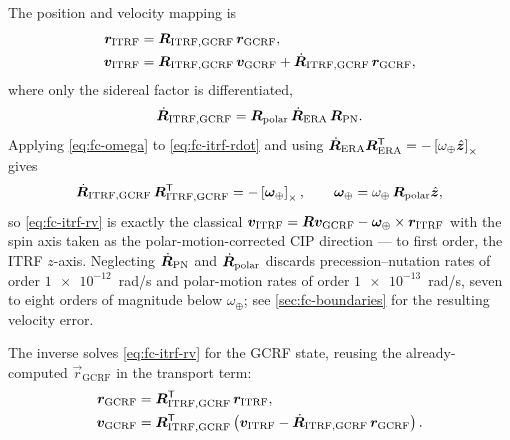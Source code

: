 The position and velocity mapping is
%
\begin{align}
  \label{eq:fc-itrf-rv}
  \bm{r}_{\mathrm{ITRF}} &= \bm{R}_{\mathrm{ITRF},\mathrm{GCRF}}\,\bm{r}_{\mathrm{GCRF}}, \\
  \bm{v}_{\mathrm{ITRF}} &= \bm{R}_{\mathrm{ITRF},\mathrm{GCRF}}\,\bm{v}_{\mathrm{GCRF}}
    + \dot{\bm{R}}_{\mathrm{ITRF},\mathrm{GCRF}}\,\bm{r}_{\mathrm{GCRF}},
  \nonumber
\end{align}
%
where only the sidereal factor is differentiated,
%
\begin{equation}
  \label{eq:fc-itrf-rdot}
  \dot{\bm{R}}_{\mathrm{ITRF},\mathrm{GCRF}}
  = \bm{R}_{\mathrm{polar}}\,\dot{\bm{R}}_{\mathrm{ERA}}\,\bm{R}_{\mathrm{PN}} .
\end{equation}
%
Applying \cref{eq:fc-omega} to \cref{eq:fc-itrf-rdot} and using
$\dot{\bm{R}}_{\mathrm{ERA}}\bm{R}_{\mathrm{ERA}}^{\mathsf{T}}
= -\left[\omega_\oplus\hat{\bm{z}}\right]_\times$ gives
%
\begin{equation}
  \label{eq:fc-itrf-omega}
  \dot{\bm{R}}_{\mathrm{ITRF},\mathrm{GCRF}}\,
  \bm{R}_{\mathrm{ITRF},\mathrm{GCRF}}^{\mathsf{T}}
  = -\left[\bm{\omega}_\oplus\right]_\times,
  \qquad
  \bm{\omega}_\oplus = \omega_\oplus\, \bm{R}_{\mathrm{polar}}\hat{\bm{z}},
\end{equation}
%
so \cref{eq:fc-itrf-rv} is exactly the classical
$\bm{v}_{\mathrm{ITRF}} = \bm{R}\bm{v}_{\mathrm{GCRF}}
- \bm{\omega}_\oplus\times\bm{r}_{\mathrm{ITRF}}$ with the spin axis taken
as the polar-motion-corrected CIP direction --- to first order, the ITRF
$z$-axis. Neglecting $\dot{\bm{R}}_{\mathrm{PN}}$ and
$\dot{\bm{R}}_{\mathrm{polar}}$ discards precession--nutation rates of
order $\num{1e-12}$~rad/s and polar-motion rates of order $\num{1e-13}$~rad/s,
seven to eight orders of magnitude below $\omega_\oplus$; see
\cref{sec:fc-boundaries} for the resulting velocity error.

The inverse solves \cref{eq:fc-itrf-rv} for the GCRF state, reusing the
already-computed $\vec{r}_{\mathrm{GCRF}}$ in the transport term:
%
\begin{align}
  \label{eq:fc-itrf-inv}
  \bm{r}_{\mathrm{GCRF}} &= \bm{R}_{\mathrm{ITRF},\mathrm{GCRF}}^{\mathsf{T}}\,\bm{r}_{\mathrm{ITRF}}, \\
  \bm{v}_{\mathrm{GCRF}} &= \bm{R}_{\mathrm{ITRF},\mathrm{GCRF}}^{\mathsf{T}}
    \left(\bm{v}_{\mathrm{ITRF}} - \dot{\bm{R}}_{\mathrm{ITRF},\mathrm{GCRF}}\,\bm{r}_{\mathrm{GCRF}}\right).
  \nonumber
\end{align}

